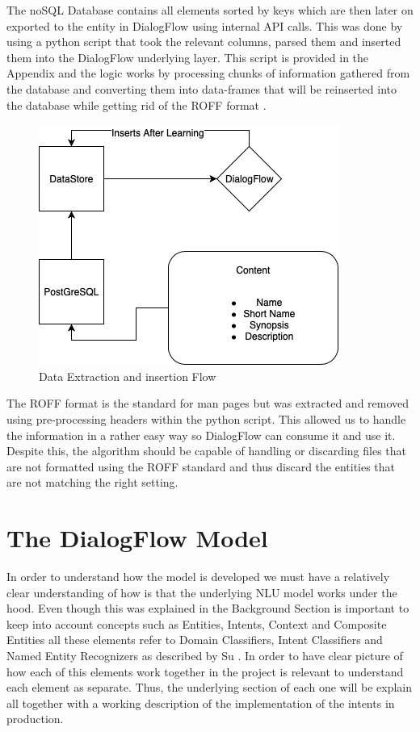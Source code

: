 The noSQL Database contains all elements sorted by keys which are then later on exported to the entity in DialogFlow using internal API calls. This was done by using a python script that took the relevant columns, parsed them and inserted them into the DialogFlow underlying layer. This script is provided in the Appendix and the logic works by processing chunks of information gathered from the database and converting them into data-frames that will be reinserted into the database while getting rid of the ROFF format \cite{roff}.

\begin{figure}[!ht]
    \centering
    \includegraphics[scale=0.70]{MA-BA-Thesis/DataExtractedDial.png}
    \caption{Data Extraction and insertion Flow}
    \label{fig:dataExtractedFlow}
\end{figure}

The ROFF format is the standard for man pages but was extracted and removed using pre-processing headers within the python script. This allowed us to handle the information in a rather easy way so DialogFlow can consume it and use it. Despite this, the algorithm should be capable of handling or discarding files that are not formatted using the ROFF standard and thus discard the entities that are not matching the right setting.

\section{The DialogFlow Model}

In order to understand how the model is developed we must have a relatively clear understanding of how is that the underlying NLU model works under the hood. Even though this was explained in the Background Section is important to keep into account concepts such as Entities, Intents, Context and Composite Entities all these elements refer to Domain Classifiers, Intent Classifiers and Named Entity Recognizers as described by Su \cite{amazon_nlu}. In order to have clear picture of how each of this elements work together in the project is relevant to understand each element as separate. Thus, the underlying section of each one will be explain all together with a working description of the implementation of the intents in production.

